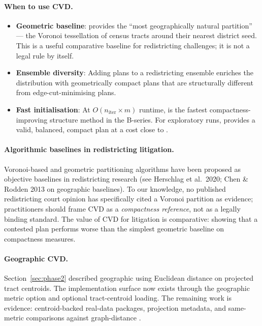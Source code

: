 \paragraph{When to use CVD.}
\begin{itemize}
\item \textbf{Geometric baseline}: \cvd{} provides the ``most geographically
  natural partition'' --- the Voronoi tessellation of census tracts around
  their nearest district seed.
  This is a useful comparative baseline for redistricting challenges; it is not
  a legal rule by itself.
\item \textbf{Ensemble diversity}: Adding \cvd{} plans to a redistricting
  ensemble enriches the distribution with geometrically compact plans that
  are structurally different from edge-cut-minimising plans.
\item \textbf{Fast initialisation}: At $O(n_{\mathrm{iter}} \times m)$ runtime,
  \cvd{} is the fastest compactness-improving structure method in the B-series.
  For exploratory runs, \cvd{} provides a valid, balanced, compact plan
  at a cost close to \metis{}.
\end{itemize}

\paragraph{Algorithmic baselines in redistricting litigation.}
Voronoi-based and geometric partitioning algorithms have been proposed as
objective baselines in redistricting research (see Herschlag et al.\ 2020;
Chen \& Rodden 2013 on geographic baselines).
To our knowledge, no published redistricting court opinion has specifically
cited a Voronoi partition as evidence; practitioners should frame CVD as a
\emph{compactness reference}, not as a legally binding standard.
The value of CVD for litigation is comparative: showing that a contested plan
performs worse than the simplest geometric baseline on compactness measures.

\paragraph{Geographic CVD.}
Section~\ref{sec:phase2} described geographic \cvd{} using Euclidean distance
on projected tract centroids.
The implementation surface now exists through the geographic metric option and
optional tract-centroid loading.
The remaining work is evidence: centroid-backed real-data packages, projection
metadata, and same-metric comparisons against graph-distance \cvd{}.

